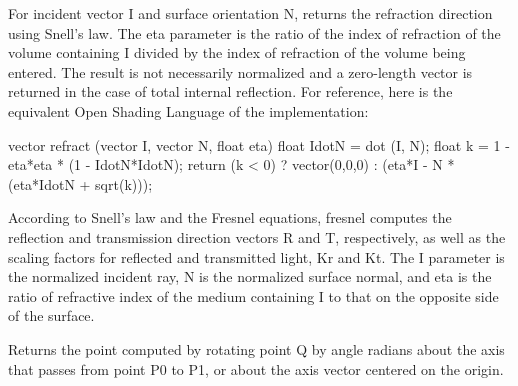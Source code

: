 \documentclass[11pt,letterpaper]{book}
\def\langname{Open Shading Language\xspace}
\begin{document}
For incident vector {\cf I} and surface orientation {\cf N}, 
returns the refraction direction using Snell's law. The {\cf eta} 
parameter is the ratio of the index of refraction of the volume containing
{\cf I} divided by the index of refraction of the volume being entered.
The result is not necessarily normalized and a zero-length vector is 
returned in the case of total internal reflection.  
For reference, here is the equivalent \langname of the implementation:

\begin{code}
vector refract (vector I, vector N, float eta)
{
    float IdotN = dot (I, N);
    float k = 1 - eta*eta * (1 - IdotN*IdotN);
    return (k < 0) ? vector(0,0,0) : (eta*I - N * (eta*IdotN + sqrt(k)));
}
\end{code}
\apiend

According to Snell's law and the Fresnel equations, {\cf fresnel}
computes the reflection and transmission direction vectors {\cf R} and
{\cf T}, respectively, as well as the scaling factors for reflected
and transmitted light, {\cf Kr} and {\cf Kt}.  The {\cf I} parameter
is the normalized incident ray, {\cf N} is the normalized surface normal,
and {\cf eta} is the ratio of refractive index of the medium
containing {\cf I} to that on the opposite side of the surface.
\apiend

Returns the point computed by rotating point {\cf Q} by {\cf angle}
radians about the axis that passes from point {\cf P0} to {\cf P1},
or about the {\cf axis} vector centered on the origin.
\apiend

\end{document}

